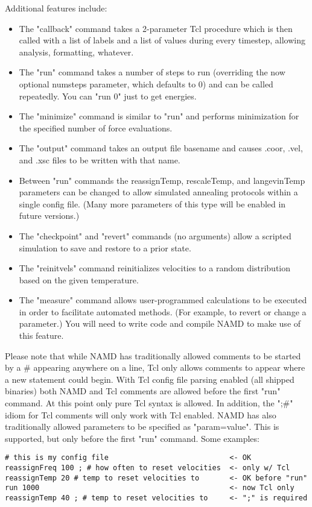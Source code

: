 Additional features include:
\begin{itemize}
 \item The "callback" command takes a 2-parameter Tcl procedure which
    is then called with a list of labels and a list of values during
    every timestep, allowing analysis, formatting, whatever.
 \item The "run" command takes a number of steps to run (overriding the
    now optional numsteps parameter, which defaults to 0) and can be
    called repeatedly.  You can "run 0" just to get energies.
 \item The "minimize" command is similar to "run" and performs
    minimization for the specified number of force evaluations.
 \item The "output" command takes an output file basename and causes
    .coor, .vel, and .xsc files to be written with that name.
 \item Between "run" commands the reassignTemp, rescaleTemp, and
    langevinTemp parameters can be changed to allow simulated
    annealing protocols within a single config file.  (Many more
    parameters of this type will be enabled in future versions.)
 \item The "checkpoint" and "revert" commands (no arguments) allow
    a scripted simulation to save and restore to a prior state.
 \item The "reinitvels" command reinitializes velocities to a
    random distribution based on the given temperature.
 \item The "measure" command allows user-programmed calculations to
    be executed in order to facilitate automated methods.  (For
    example, to revert or change a parameter.)  You will need to
    write code and compile NAMD to make use of this feature.
\end{itemize}

Please note that while NAMD has traditionally allowed comments to be
started by a \# appearing anywhere on a line, Tcl only allows comments
to appear where a new statement could begin.  With Tcl config file
parsing enabled (all shipped binaries) both NAMD and Tcl comments are
allowed before the first "run" command.  At this point only pure Tcl
syntax is allowed.  In addition, the ";\#" idiom for Tcl comments will
only work with Tcl enabled.  NAMD has also traditionally allowed
parameters to be specified as "param=value".  This is supported, but
only before the first "run" command.  Some examples:

\begin{verbatim}
# this is my config file                            <- OK
reassignFreq 100 ; # how often to reset velocities  <- only w/ Tcl
reassignTemp 20 # temp to reset velocities to       <- OK before "run"
run 1000                                            <- now Tcl only
reassignTemp 40 ; # temp to reset velocities to     <- ";" is required
\end{verbatim}

